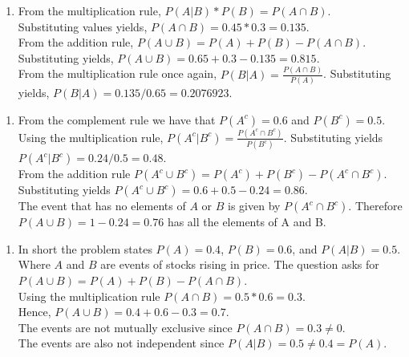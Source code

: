 \documentclass[
  letterpaper,
  DIV=11,
  numbers=noendperiod]{scrreprt}
\providecommand{\tightlist}{%
  \setlength{\itemsep}{0pt}\setlength{\parskip}{0pt}}\usepackage{longtable,booktabs,array}
\begin{document}
\begin{blackbox}

\begin{enumerate}
\def\labelenumi{\arabic{enumi}.}
\tightlist
\item
  From the multiplication rule, \(P(A|B)*P(B)=P(A \cap B)\).\\
  Substituting values yields, \(P(A \cap B)=0.45*0.3=0.135\).\\
  From the addition rule, \(P(A \cup B)=P(A)+P(B)-P(A \cap B)\).\\
  Substituting yields, \(P(A \cup B)=0.65+0.3-0.135=0.815\).\\
  From the multiplication rule once again,
  \(P(B|A)=\frac{P(A \cap B)}{P(A)}\). Substituting yields,
  \(P(B|A)=0.135/0.65=0.2076923\).
\end{enumerate}

\end{blackbox}

\begin{blackbox}

\begin{enumerate}
\def\labelenumi{\arabic{enumi}.}
\setcounter{enumi}{1}
\tightlist
\item
  From the complement rule we have that \(P(A^c)=0.6\) and
  \(P(B^c)=0.5\).\\
  Using the multiplication rule,
  \(P(A^c|B^c)=\frac{P(A^c \cap B^c)}{P(B^c)}\). Substituting yields
  \(P(A^c|B^c)=0.24/0.5=0.48\).\\
  From the addition rule
  \(P(A^c \cup B^c)=P(A^c)+P(B^c)-P(A^c \cap B^c)\).\\
  Substituting yields \(P(A^c \cup B^c)=0.6+0.5-0.24=0.86\).\\
  The event that has no elements of \(A\) or \(B\) is given by
  \(P(A^c \cap B^c)\). Therefore \(P(A \cup B)=1-0.24=0.76\) has all the
  elements of A and B.
\end{enumerate}

\end{blackbox}

\begin{blackbox}

\begin{enumerate}
\def\labelenumi{\arabic{enumi}.}
\setcounter{enumi}{2}
\tightlist
\item
  In short the problem states \(P(A)=0.4\), \(P(B)=0.6\), and
  \(P(A|B)=0.5\). Where \(A\) and \(B\) are events of stocks rising in
  price. The question asks for \(P(A \cup B)=P(A)+P(B)-P(A \cap B)\).\\
  Using the multiplication rule \(P(A \cap B)=0.5*0.6=0.3\).\\
  Hence, \(P(A \cup B)=0.4+0.6-0.3=0.7\).\\
  The events are not mutually exclusive since
  \(P(A \cap B)=0.3 \neq 0\).\\
  The events are also not independent since
  \(P(A|B)=0.5 \neq 0.4=P(A)\).
\end{enumerate}

\end{blackbox}
\end{document}
